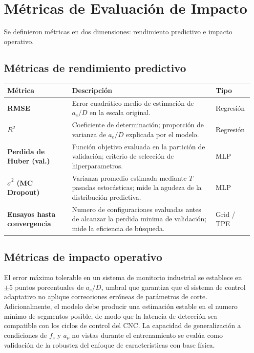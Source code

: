 \documentclass[12pt, letterpaper]{article}
\begin{document}
\section{Métricas de Evaluación de Impacto}

Se definieron métricas en dos dimensiones: rendimiento predictivo e impacto operativo.

\subsection{Métricas de rendimiento predictivo}

\begin{longtable}{>{\bfseries}p{4.0cm} p{7.2cm} p{2.5cm}}
  \toprule
  \textbf{Métrica} & \textbf{Descripción} & \textbf{Tipo} \\
  \midrule
  \endhead
  RMSE & Error cuadrático medio de estimación de $a_e/D$ en la escala original. & Regresión \\[0.3cm]
  $R^2$ & Coeficiente de determinación; proporción de varianza de $a_e/D$ explicada por el modelo. & Regresión \\[0.3cm]
  Perdida de Huber (val.) & Función objetivo evaluada en la partición de validación; criterio de selección de hiperparametros. & MLP \\[0.3cm]
  $\hat{\sigma}^2$ (MC Dropout) & Varianza promedio estimada mediante $T$ pasadas estocásticas; mide la agudeza de la distribución predictiva. & MLP \\[0.3cm]
  Ensayos hasta convergencia & Numero de configuraciones evaluadas antes de alcanzar la perdida minima de validación; mide la eficiencia de búsqueda. & Grid / TPE \\
  \bottomrule
\end{longtable}

\subsection{Métricas de impacto operativo}

El error máximo tolerable en un sistema de monitorio industrial se establece en $\pm 5$ puntos porcentuales de $a_e/D$, umbral que garantiza que el sistema de control adaptativo no aplique correcciones erróneas de parámetros de corte. Adicionalmente, el modelo debe producir una estimación estable en el numero mínimo de segmentos posible, de modo que la latencia de detección sea compatible con los ciclos de control del CNC. La capacidad de generalización a condiciones de $f_z$ y $a_p$ no vistas durante el entrenamiento se evalúa como validación de la robustez del enfoque de características con base física.
\end{document}
